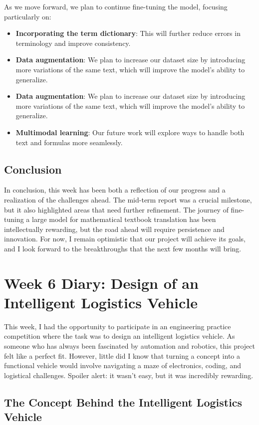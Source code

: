 \documentclass[a4paper]{article} 	%
\begin{document}
As we move forward, we plan to continue fine-tuning the model, focusing particularly on:
\begin{itemize}
	\item \textbf{Incorporating the term dictionary}: This will further reduce errors in terminology and improve consistency.
	\item \textbf{Data augmentation}: We plan to increase our dataset size by introducing more variations of the same text, which will improve the model’s ability to generalize.
	\item \textbf{Data augmentation}: We plan to increase our dataset size by introducing more variations of the same text, which will improve the model’s ability to generalize.
	\item \textbf{Multimodal learning}: Our future work will explore ways to handle both text and formulas more seamlessly.
\end{itemize}

\subsection*{Conclusion}

In conclusion, this week has been both a reflection of our progress and a realization of the challenges ahead. The mid-term report was a crucial milestone, but it also highlighted areas that need further refinement. The journey of fine-tuning a large model for mathematical textbook translation has been intellectually rewarding, but the road ahead will require persistence and innovation. For now, I remain optimistic that our project will achieve its goals, and I look forward to the breakthroughs that the next few months will bring.

\section{Week 6 Diary: Design of an Intelligent Logistics Vehicle}

This week, I had the opportunity to participate in an engineering practice competition where the task was to design an intelligent logistics vehicle. As someone who has always been fascinated by automation and robotics, this project felt like a perfect fit. However, little did I know that turning a concept into a functional vehicle would involve navigating a maze of electronics, coding, and logistical challenges. Spoiler alert: it wasn’t easy, but it was incredibly rewarding.

\subsection*{The Concept Behind the Intelligent Logistics Vehicle}
\end{document}
